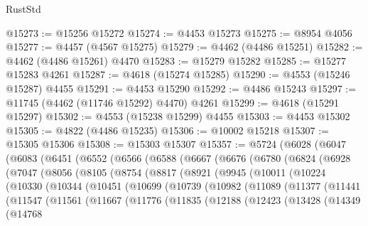 \begin{lexlean}{RustStd}
\begin{coremodule}
@15273 := @15256 @15272
@15274 := @4453 @15273
@15275 := @8954 @4056
@15277 := @4457 (@4567 @15275)
@15279 := @4462 (@4486 @15251)
@15282 := @4462 (@4486 @15261) @4470
@15283 := @15279 @15282
@15285 := @15277 @15283 @4261
@15287 := @4618 (@15274 @15285)
@15290 := @4553 (@15246 @15287) @4455
@15291 := @4453 @15290
@15292 := @4486 @15243
@15297 := @11745 (@4462 (@11746 @15292) @4470) @4261
@15299 := @4618 (@15291 @15297)
@15302 := @4553 (@15238 @15299) @4455
@15303 := @4453 @15302
@15305 := @4822 (@4486 @15235)
@15306 := @10002 @15218
@15307 := @15305 @15306
@15308 := @15303 @15307
@15357 := @5724
    (@6028
      (@6047
        (@6083
          (@6451
            (@6552
              (@6566
                (@6588
                  (@6667
                    (@6676
                      (@6780
                        (@6824
                          (@6928
                            (@7047
                              (@8056
                                (@8105
                                  (@8754
                                    (@8817
                                      (@8921
                                        (@9945
                                          (@10011
                                            (@10224
                                              (@10330
                                                (@10344
                                                  (@10451
                                                    (@10699
                                                      (@10739
                                                        (@10982
                                                          (@11089
                                                            (@11377
                                                              (@11441
                                                                (@11547
                                                                  (@11561
                                                                    (@11667
                                                                      (@11776
                                                                        (@11835
                                                                          (@12188
                                                                            (@12423
                                                                              (@13428
                                                                                (@14349
                                                                                  (@14768

\end{coremodule}
\end{lexlean}

